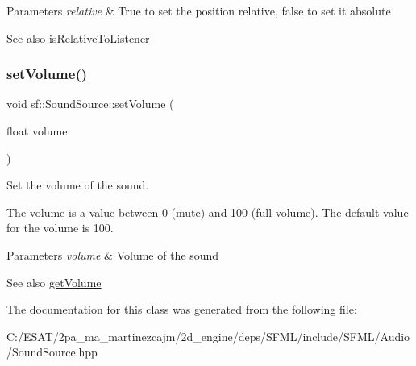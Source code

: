 \begin{DoxyParams}{Parameters}
{\em relative} & True to set the position relative, false to set it absolute\\
\hline
\end{DoxyParams}
\begin{DoxySeeAlso}{See also}
\hyperlink{classsf_1_1_sound_source_adcdb4ef32c2f4481d34aff0b5c31534b}{is\+Relative\+To\+Listener} 
\end{DoxySeeAlso}
\mbox{\label{classsf_1_1_sound_source_a2f192f2b49fb8e2b82f3498d3663fcc2}} 
\subsubsection{\texorpdfstring{set\+Volume()}{setVolume()}}
{\footnotesize\ttfamily void sf\+::\+Sound\+Source\+::set\+Volume (\begin{DoxyParamCaption}\item[{float}]{volume }\end{DoxyParamCaption})}



Set the volume of the sound. 

The volume is a value between 0 (mute) and 100 (full volume). The default value for the volume is 100.


\begin{DoxyParams}{Parameters}
{\em volume} & Volume of the sound\\
\hline
\end{DoxyParams}
\begin{DoxySeeAlso}{See also}
\hyperlink{classsf_1_1_sound_source_a04243fb5edf64561689b1d58953fc4ce}{get\+Volume} 
\end{DoxySeeAlso}


The documentation for this class was generated from the following file\+:\begin{DoxyCompactItemize}
\item 
C\+:/\+E\+S\+A\+T/2pa\+\_\+ma\+\_\+martinezcajm/2d\+\_\+engine/deps/\+S\+F\+M\+L/include/\+S\+F\+M\+L/\+Audio/Sound\+Source.\+hpp\end{DoxyCompactItemize}
